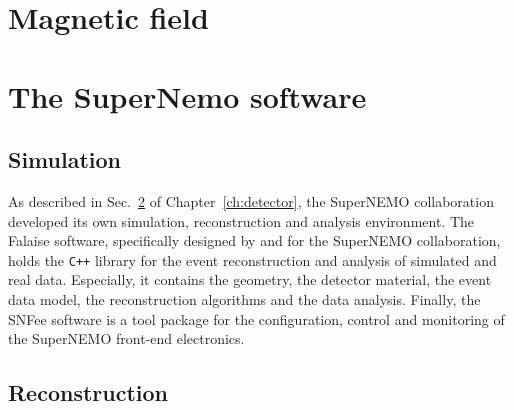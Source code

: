 \section{Magnetic field}
\label{sec:magnetic_field}

\section{The SuperNemo software}
\label{sec:SNsoftware}
\subsection{Simulation}

As described in Sec.~\ref{sec:SNsoftware} of Chapter~\ref{ch:detector}, the SuperNEMO collaboration developed its own simulation, reconstruction and analysis environment.
The Falaise software, specifically designed by and for the SuperNEMO collaboration, holds the \verb!C++! library for the event reconstruction and analysis of simulated and real data.
Especially, it contains the geometry, the detector material, the event data model, the reconstruction algorithms and the data analysis.
Finally, the SNFee software is a tool package for the configuration, control and monitoring of the SuperNEMO front-end electronics.

\subsection{Reconstruction}
